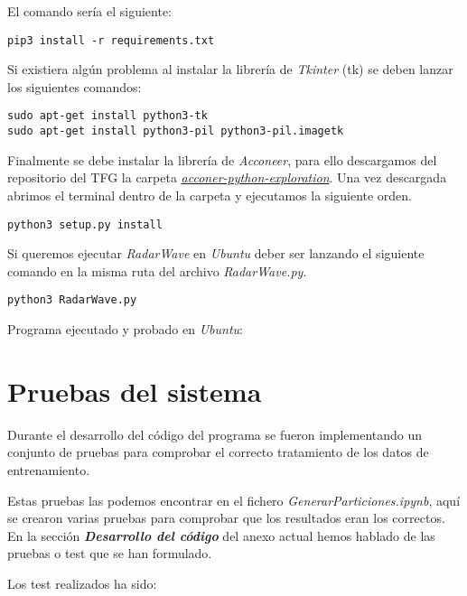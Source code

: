 El comando sería el siguiente:
\begin{verbatim}
pip3 install -r requirements.txt
\end{verbatim}

Si existiera algún problema al instalar la librería de \textit{Tkinter} (tk) se deben lanzar los siguientes comandos:
\begin{verbatim}
sudo apt-get install python3-tk
sudo apt-get install python3-pil python3-pil.imagetk
\end{verbatim}

Finalmente se debe instalar la librería de \textit{Acconeer}, para ello descargamos del repositorio del TFG la carpeta \href{https://github.com/mecyc/TFG_RADAR_60GHZ/tree/main/acconeer-python-exploration}{\textit{acconer-python-exploration}}. Una vez descargada abrimos el terminal dentro de la carpeta y ejecutamos la siguiente orden.

\begin{verbatim}
python3 setup.py install
\end{verbatim}

Si queremos ejecutar \textit{RadarWave} en \textit{Ubuntu} deber ser lanzando el siguiente comando en la misma ruta del archivo \textit{RadarWave.py}.

\begin{verbatim}
python3 RadarWave.py
\end{verbatim}

Programa ejecutado y probado en \textit{Ubuntu}:


\section{Pruebas del sistema}
Durante el desarrollo del código del programa se fueron implementando un conjunto de pruebas para comprobar el correcto tratamiento de los datos de entrenamiento.

Estas pruebas las podemos encontrar en el fichero \textit{GenerarParticiones.ipynb}, aquí se crearon varias pruebas para comprobar que los resultados eran los correctos. En la sección \textbf{\textit{Desarrollo del código}} del anexo actual hemos hablado de las pruebas o test que se han formulado.

Los test realizados ha sido:

